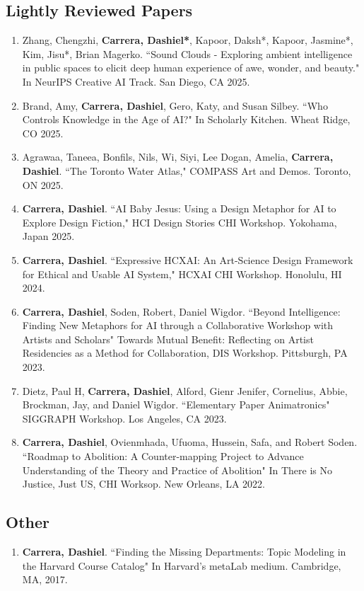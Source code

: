 \subsection{Lightly Reviewed Papers}
\begin{enumerate}

\item Zhang, Chengzhi, \textbf{Carrera, Dashiel*}, Kapoor, Daksh*, Kapoor, Jasmine*, Kim, Jisu*, Brian Magerko. ``Sound Clouds - Exploring ambient intelligence in public spaces to elicit deep human experience of awe, wonder, and beauty." In NeurIPS Creative AI Track. San Diego, CA 2025.

 \item Brand, Amy, \textbf{Carrera, Dashiel}, Gero, Katy, and Susan Silbey. ``Who Controls Knowledge in the Age of AI?" In Scholarly Kitchen. Wheat Ridge, CO 2025. \\
 \item Agrawaa, Taneea, Bonfils, Nils, Wi, Siyi, Lee Dogan, Amelia, \textbf{Carrera, Dashiel}. ``The Toronto Water Atlas," COMPASS Art and Demos. Toronto, ON 2025. \\
 \item \textbf{Carrera, Dashiel}. ``AI Baby Jesus: Using a Design Metaphor for AI to Explore Design Fiction," HCI Design Stories CHI Workshop. Yokohama, Japan 2025. \\
 \item \textbf{Carrera, Dashiel}. ``Expressive HCXAI: An Art-Science Design Framework for Ethical and Usable AI System," HCXAI CHI Workshop. Honolulu, HI 2024. \\
  \item \textbf{Carrera, Dashiel}, Soden, Robert, Daniel Wigdor. ``Beyond Intelligence: Finding New Metaphors for AI through a Collaborative Workshop with Artists and Scholars" Towards Mutual Benefit: Reflecting on Artist Residencies as a Method for Collaboration, DIS Workshop. Pittsburgh, PA 2023. \\
   \item  Dietz, Paul H, \textbf{Carrera, Dashiel}, Alford, Gienr Jenifer, Cornelius, Abbie, Brockman, Jay, and Daniel Wigdor. ``Elementary Paper Animatronics" SIGGRAPH Workshop. Los Angeles, CA 2023. \\
  \item \textbf{Carrera, Dashiel}, Ovienmhada, Ufuoma, Hussein, Safa, and Robert Soden. ``Roadmap to Abolition: A Counter-mapping Project to Advance Understanding of the Theory and Practice of Abolition" In There is No Justice, Just US, CHI Worksop. New Orleans, LA 2022. 
  \end{enumerate}
  
\subsection{Other}
\begin{enumerate}
\item \textbf{Carrera, Dashiel}. ``Finding the Missing Departments: Topic Modeling in the Harvard Course Catalog" In Harvard's metaLab medium. Cambridge, MA, 2017.\\
\end{enumerate} 



